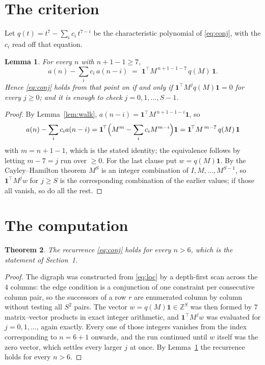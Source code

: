 \documentclass[11pt,a4paper]{article}
\theoremstyle{plain}
\newtheorem{theorem}{Theorem}
\newtheorem{lemma}[theorem]{Lemma}
\theoremstyle{definition}
\begin{document}
\section{The criterion}

Let $q(t)=t^{7}-\sum_i c_i\,t^{7-i}$ be the characteristic polynomial of
\eqref{eq:conj}, with the $c_i$ read off that equation.

\begin{lemma}\label{lem:crit}
For every $n$ with $n+1-1\ge7$,
\[
a(n)-\sum_i c_i\,a(n-i)\;=\;\mathbf{1}^{\!\top}M^{\,n+1-1-7}\,q(M)\,\mathbf{1} .
\]
Hence \eqref{eq:conj} holds from that point on if and only if
$\mathbf{1}^{\!\top}M^{j}q(M)\mathbf{1}=0$ for every $j\ge0$; and it is enough to check
$j=0,1,\dots,S-1$.
\end{lemma}

\begin{proof}
By Lemma~\ref{lem:walk}, $a(n-i)=\mathbf{1}^{\!\top}M^{\,n+1-1-i}\mathbf{1}$, so
\[
a(n)-\sum_i c_i a(n-i)
=\mathbf{1}^{\!\top}\Bigl(M^{m}-\sum_i c_i M^{m-i}\Bigr)\mathbf{1}
=\mathbf{1}^{\!\top}M^{\,m-7}\,q(M)\,\mathbf{1}
\]
with $m=n+1-1$, which is the stated identity; the equivalence follows by letting
$m-7=j$ run over $\ge0$. For the last clause put $w=q(M)\mathbf{1}$. By the
Cayley--Hamilton theorem $M^{S}$ is an integer combination of $I,M,\dots,M^{S-1}$, so
$\mathbf{1}^{\!\top}M^{j}w$ for $j\ge S$ is the corresponding combination of the earlier
values; if those all vanish, so do all the rest.
\end{proof}

\section{The computation}

\begin{theorem}
The recurrence \eqref{eq:conj} holds for every $n>6$, which is the statement of
Section~1.
\end{theorem}

\begin{proof}
The digraph was constructed from \eqref{eq:loc} by a depth-first scan across the $4$
columns: the edge condition is a conjunction of one constraint per consecutive column
pair, so the successors of a row $r$ are enumerated column by column without testing all
$S^2$ pairs. The vector $w=q(M)\mathbf{1}\in\mathbb{Z}^{S}$ was then formed by $7$
matrix--vector products in exact integer arithmetic, and $\mathbf{1}^{\!\top}M^{j}w$ was
evaluated for $j=0,1,\dots$, again exactly. Every one of those integers vanishes from the
index corresponding to $n=6+1$ onwards, and the run continued until $w$ itself was the
zero vector, which settles every larger $j$ at once. By Lemma~\ref{lem:crit} the recurrence
holds for every $n>6$.
\end{proof}
\end{document}
